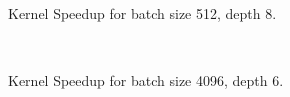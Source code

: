 \begin{figure}[ht]
  \begin{subfigure}[b]{.3\textwidth}
    \caption{Kernel Speedup for batch size 512, depth 8.}
  \end{subfigure}
  \\  %
  \begin{subfigure}[b]{.3\textwidth}
    \caption{Kernel Speedup for batch size 4096, depth 6.}
  \end{subfigure}
  \hfill
  \begin{subfigure}[b]{.3\textwidth}

\end{subfigure}
\end{figure}
